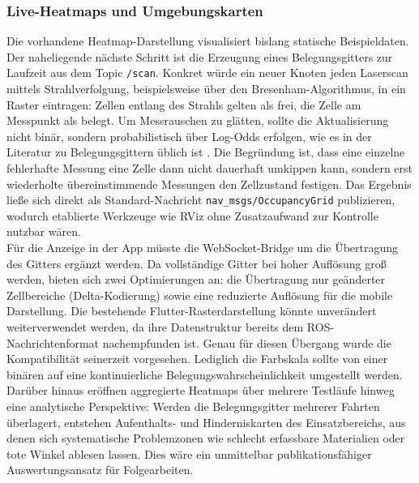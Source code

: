 \subsubsection{Live-Heatmaps und Umgebungskarten}
Die vorhandene Heatmap-Darstellung visualisiert bislang statische Beispieldaten. Der naheliegende nächste Schritt ist die Erzeugung eines Belegungsgitters zur Laufzeit aus dem Topic \texttt{/scan}. Konkret würde ein neuer Knoten jeden Laserscan mittels Strahlverfolgung, beispielsweise über den Bresenham-Algorithmus, in ein Raster eintragen: Zellen entlang des Strahls gelten als frei, die Zelle am Messpunkt als belegt. Um Messrauschen zu glätten, sollte die Aktualisierung nicht binär, sondern probabilistisch über Log-Odds erfolgen, wie es in der Literatur zu Belegungsgittern üblich ist \cite{hornung2013octomap}. Die Begründung ist, dass eine einzelne fehlerhafte Messung eine Zelle dann nicht dauerhaft umkippen kann, sondern erst wiederholte übereinstimmende Messungen den Zellzustand festigen. Das Ergebnis ließe sich direkt als Standard-Nachricht \texttt{nav\_msgs/OccupancyGrid} publizieren, wodurch etablierte Werkzeuge wie RViz ohne Zusatzaufwand zur Kontrolle nutzbar wären.
\\
Für die Anzeige in der App müsste die WebSocket-Bridge um die Übertragung des Gitters ergänzt werden. Da vollständige Gitter bei hoher Auflösung groß werden, bieten sich zwei Optimierungen an: die Übertragung nur geänderter Zellbereiche (Delta-Kodierung) sowie eine reduzierte Auflösung für die mobile Darstellung. Die bestehende Flutter-Rasterdarstellung könnte unverändert weiterverwendet werden, da ihre Datenstruktur bereits dem ROS-Nachrichtenformat nachempfunden ist. Genau für diesen Übergang wurde die Kompatibilität seinerzeit vorgesehen. Lediglich die Farbskala sollte von einer binären auf eine kontinuierliche Belegungswahrscheinlichkeit umgestellt werden.
\\
Darüber hinaus eröffnen aggregierte Heatmaps über mehrere Testläufe hinweg eine analytische Perspektive: Werden die Belegungsgitter mehrerer Fahrten überlagert, entstehen Aufenthalts- und Hinderniskarten des Einsatzbereichs, aus denen sich systematische Problemzonen wie schlecht erfassbare Materialien oder tote Winkel ablesen lassen. Dies wäre ein unmittelbar publikationsfähiger Auswertungsansatz für Folgearbeiten.

